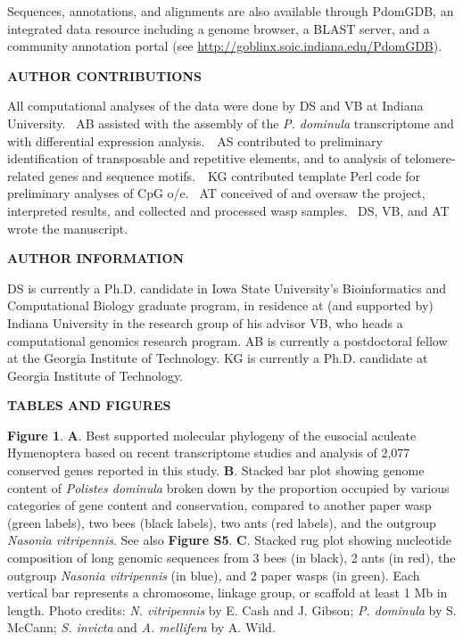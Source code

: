 \documentclass[]{article}
\begin{document}
Sequences, annotations, and alignments are also available through
PdomGDB, an integrated data resource including a genome browser, a BLAST
server, and a community annotation portal (see
\url{http://goblinx.soic.indiana.edu/PdomGDB}).

\textbf{AUTHOR CONTRIBUTIONS}

All computational analyses of the data were done by DS and VB at Indiana
University.~ AB assisted with the assembly of the \emph{P. dominula}
transcriptome and with differential expression analysis.~~AS contributed
to preliminary identification of transposable and repetitive elements,
and to analysis of telomere-related genes and sequence motifs.~~KG
contributed template Perl code for preliminary analyses of CpG o/e.~ AT
conceived of and oversaw the project, interpreted results, and collected
and processed wasp samples.~ DS, VB, and AT wrote the manuscript.

\textbf{AUTHOR INFORMATION}

DS is currently a Ph.D. candidate in Iowa State University's
Bioinformatics and Computational Biology graduate program, in residence
at (and supported by) Indiana University in the research group of his
advisor VB, who heads a computational genomics research program. AB is
currently a postdoctoral fellow at the Georgia Institute of Technology.
KG is currently a Ph.D. candidate at Georgia Institute of Technology.

\textbf{TABLES AND FIGURES}

\textbf{Figure 1}. \textbf{A}. Best supported molecular phylogeny of the
eusocial aculeate Hymenoptera based on recent transcriptome studies and
analysis of 2,077 conserved genes reported in this study. \textbf{B}.
Stacked bar plot showing genome content of \emph{Polistes dominula}
broken down by the proportion occupied by various categories of gene
content and conservation, compared to another paper wasp (green labels),
two bees (black labels), two ants (red labels), and the outgroup
\emph{Nasonia vitripennis}. See also \textbf{Figure S5}. \textbf{C}.
Stacked rug plot showing nucleotide composition of long genomic
sequences from 3 bees (in black), 2 ants (in red)\emph{,} the outgroup
\emph{Nasonia vitripennis} (in blue)\emph{,} and 2 paper wasps (in
green). Each vertical bar represents a chromosome, linkage group, or
scaffold at least 1 Mb in length. Photo credits: \emph{N. vitripennis}
by E. Cash and J. Gibson; \emph{P. dominula} by S. McCann; \emph{S.
invicta} and \emph{A. mellifera} by A. Wild.
\end{document}
